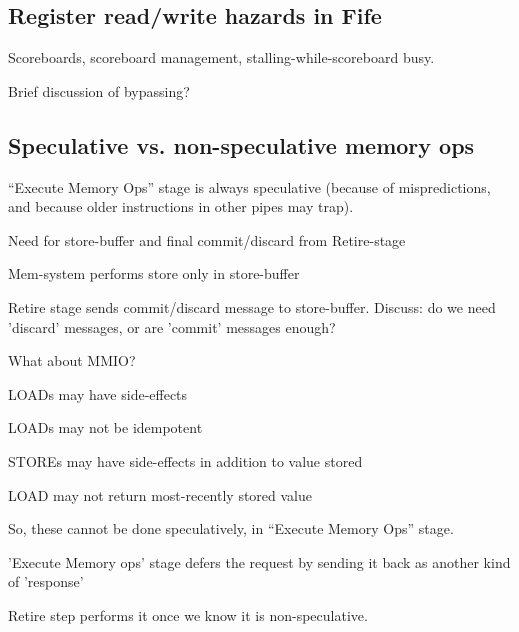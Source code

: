 
\subsection{Register read/write hazards in Fife}

Scoreboards, scoreboard management, stalling-while-scoreboard busy.

Brief discussion of bypassing?


\subsection{Speculative vs. non-speculative memory ops}

``Execute Memory Ops'' stage is always speculative (because of
mispredictions, and because older instructions in other pipes may
trap).

\begin{tightlist}
  \item Need for store-buffer and final commit/discard from Retire-stage
  \item Mem-system performs store only in store-buffer
  \item Retire stage sends commit/discard message to store-buffer.
        Discuss: do we need 'discard' messages, or are 'commit' messages enough?
\end{tightlist}

What about MMIO?

\begin{tightlist}
  \item LOADs may have side-effects
  \item LOADs may not be idempotent
  \item STOREs may have side-effects in addition to value stored
  \item LOAD may not return most-recently stored value
\end{tightlist}

So, these cannot be done speculatively, {\ie} in ``Execute Memory
Ops'' stage.

\begin{tightlist}

  \item 'Execute Memory ops' stage defers the request by sending it
    back as another kind of 'response'

  \item Retire step performs it once we know it is non-speculative.
\end{tightlist}

